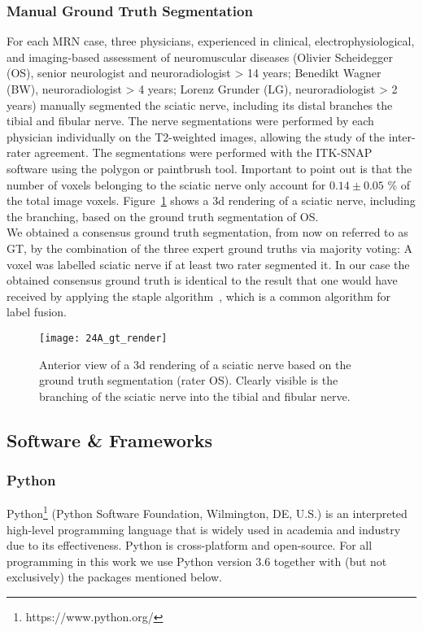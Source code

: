 \subsubsection{Manual Ground Truth Segmentation} \label{dataset_gt}
For each MRN case, three physicians, experienced in clinical, electrophysiological, and imaging-based assessment of neuromuscular diseases (Olivier Scheidegger (OS), senior neurologist and neuroradiologist > 14 years; Benedikt Wagner (BW), neuroradiologist > 4 years; Lorenz Grunder (LG), neuroradiologist > 2 years) manually segmented the sciatic nerve, including its distal branches the tibial and fibular nerve. The nerve segmentations were performed by each physician individually on the T2-weighted images, allowing the study of the inter-rater agreement. The segmentations were performed with the ITK-SNAP~\cite{py06nimg} software using the polygon or paintbrush tool. Important to point out is that the number of voxels belonging to the sciatic nerve only account for $0.14 \pm 0.05$ \% of the total image voxels. Figure~\ref{fig:gt_render} shows a \gls{3d} rendering of a sciatic nerve, including the branching, based on the ground truth segmentation of OS.\\
We obtained a consensus ground truth segmentation, from now on referred to as GT, by the combination of the three expert ground truths via majority voting: A voxel was labelled sciatic nerve if at least two rater segmented it. In our case the obtained consensus ground truth is identical to the result that one would have received by applying the \gls{staple} algorithm~\cite{Warfield2004SimultaneousSTAPLE}, which is a common algorithm for label fusion.\\

\begin{figure}[htbp]
	\texttt{[image: 24A\_gt\_render]}
    \caption[Ground Truth Rendering]{Anterior view of a \gls{3d} rendering of a sciatic nerve based on the ground truth segmentation (rater OS). Clearly visible is the branching of the sciatic nerve into the tibial and fibular nerve.}
    \label{fig:gt_render}
\end{figure}

\subsection{Software \& Frameworks}
\subsubsection{Python}
Python\footnote{https://www.python.org/} (Python Software Foundation, Wilmington, DE, U.S.) is an interpreted high-level programming language that is widely used in academia and industry due to its effectiveness. Python is cross-platform and open-source. For all programming in this work we use Python version 3.6 together with (but not exclusively) the packages mentioned below.

